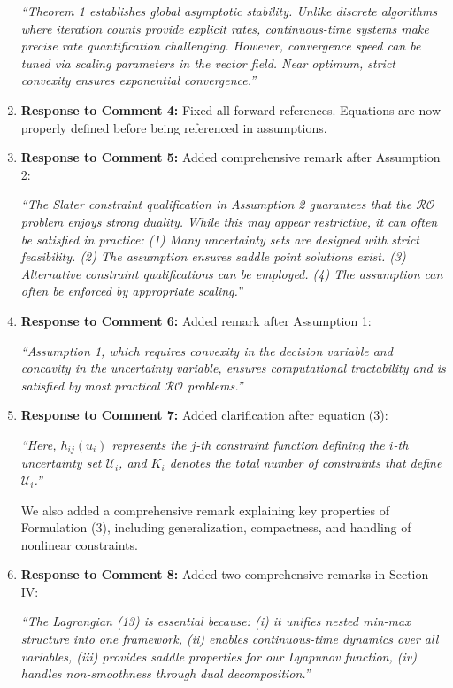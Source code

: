 \documentclass[journal,twoside,web]{ieeecolor}
\begin{document}
\begin{enumerate}
{\color{revisionblue}\textit{``Theorem 1 establishes global asymptotic stability. Unlike discrete algorithms where iteration counts provide explicit rates, continuous-time systems make precise rate quantification challenging. However, convergence speed can be tuned via scaling parameters in the vector field. Near optimum, strict convexity ensures exponential convergence.''}}

\item \textbf{Response to Comment 4:} Fixed all forward references. Equations are now properly defined before being referenced in assumptions.

\item \textbf{Response to Comment 5:} Added comprehensive remark after Assumption 2:

{\color{revisionblue}\textit{``The Slater constraint qualification in Assumption 2 guarantees that the $\mathcal{RO}$ problem enjoys strong duality. While this may appear restrictive, it can often be satisfied in practice: (1) Many uncertainty sets are designed with strict feasibility. (2) The assumption ensures saddle point solutions exist. (3) Alternative constraint qualifications can be employed. (4) The assumption can often be enforced by appropriate scaling.''}}

\item \textbf{Response to Comment 6:} Added remark after Assumption 1:

{\color{revisionblue}\textit{``Assumption 1, which requires convexity in the decision variable and concavity in the uncertainty variable, ensures computational tractability and is satisfied by most practical $\mathcal{RO}$ problems.''}}

\item \textbf{Response to Comment 7:} Added clarification after equation (3):

{\color{revisionblue}\textit{``Here, $h_{ij}(u_i)$ represents the $j$-th constraint function defining the $i$-th uncertainty set $\mathcal{U}_i$, and $K_i$ denotes the total number of constraints that define $\mathcal{U}_i$.''}}

We also added a comprehensive remark explaining key properties of Formulation (3), including generalization, compactness, and handling of nonlinear constraints.

\item \textbf{Response to Comment 8:} Added two comprehensive remarks in Section IV:

{\color{revisionblue}\textit{``The Lagrangian (13) is essential because: (i) it unifies nested min-max structure into one framework, (ii) enables continuous-time dynamics over all variables, (iii) provides saddle properties for our Lyapunov function, (iv) handles non-smoothness through dual decomposition.''}}


\end{enumerate}
\end{document}
